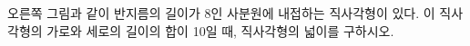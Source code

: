 \noindent\begin{minipage}[t]{0.58\linewidth}\vspace{0pt}\raggedright 오른쪽 그림과 같이 반지름의 길이가 8인 사분원에 내접하는 직사각형이 있다. 이 직사각형의 가로와 세로의 길이의 합이 10일 때, 직사각형의 넓이를 구하시오.\end{minipage}\hfill\begin{minipage}[t]{0.4\linewidth}\vspace{0pt}\centering \resizebox{\ifdim\width>\linewidth\linewidth\else\width\fi}{!}{}\end{minipage}\par
